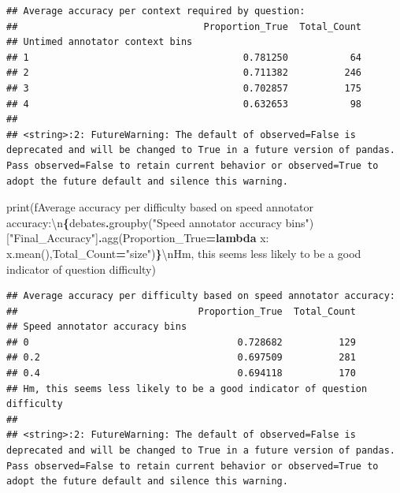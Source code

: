 \documentclass[
]{article}
\newenvironment{Shaded}{\begin{snugshade}}{\end{snugshade}}
\newcommand{\BuiltInTok}[1]{#1}
\newcommand{\CharTok}[1]{\textcolor[rgb]{0.31,0.60,0.02}{#1}}
\newcommand{\KeywordTok}[1]{\textcolor[rgb]{0.13,0.29,0.53}{\textbf{#1}}}
\newcommand{\NormalTok}[1]{#1}
\newcommand{\OperatorTok}[1]{\textcolor[rgb]{0.81,0.36,0.00}{\textbf{#1}}}
\newcommand{\SpecialCharTok}[1]{\textcolor[rgb]{0.81,0.36,0.00}{\textbf{#1}}}
\newcommand{\SpecialStringTok}[1]{\textcolor[rgb]{0.31,0.60,0.02}{#1}}
\newcommand{\StringTok}[1]{\textcolor[rgb]{0.31,0.60,0.02}{#1}}
\begin{document}
\begin{verbatim}
## Average accuracy per context required by question:
##                                 Proportion_True  Total_Count
## Untimed annotator context bins                              
## 1                                      0.781250           64
## 2                                      0.711382          246
## 3                                      0.702857          175
## 4                                      0.632653           98
## 
## <string>:2: FutureWarning: The default of observed=False is deprecated and will be changed to True in a future version of pandas. Pass observed=False to retain current behavior or observed=True to adopt the future default and silence this warning.
\end{verbatim}

\begin{Shaded}
\begin{Highlighting}[]
\BuiltInTok{print}\NormalTok{(}\SpecialStringTok{f\textquotesingle{}Average accuracy per difficulty based on speed annotator accuracy:}\CharTok{\textbackslash{}n}\SpecialCharTok{\{}\NormalTok{debates}\SpecialCharTok{.}\NormalTok{groupby(}\StringTok{"Speed annotator accuracy bins"}\NormalTok{)[}\StringTok{"Final\_Accuracy"}\NormalTok{]}\SpecialCharTok{.}\NormalTok{agg(Proportion\_True}\OperatorTok{=}\KeywordTok{lambda}\NormalTok{ x: x.mean(),Total\_Count}\OperatorTok{=}\StringTok{"size"}\NormalTok{)}\SpecialCharTok{\}}\CharTok{\textbackslash{}n}\SpecialStringTok{Hm, this seems less likely to be a good indicator of question difficulty\textquotesingle{}}\NormalTok{)}
\end{Highlighting}
\end{Shaded}

\begin{verbatim}
## Average accuracy per difficulty based on speed annotator accuracy:
##                                Proportion_True  Total_Count
## Speed annotator accuracy bins                              
## 0                                     0.728682          129
## 0.2                                   0.697509          281
## 0.4                                   0.694118          170
## Hm, this seems less likely to be a good indicator of question difficulty
## 
## <string>:2: FutureWarning: The default of observed=False is deprecated and will be changed to True in a future version of pandas. Pass observed=False to retain current behavior or observed=True to adopt the future default and silence this warning.
\end{verbatim}
\end{document}
